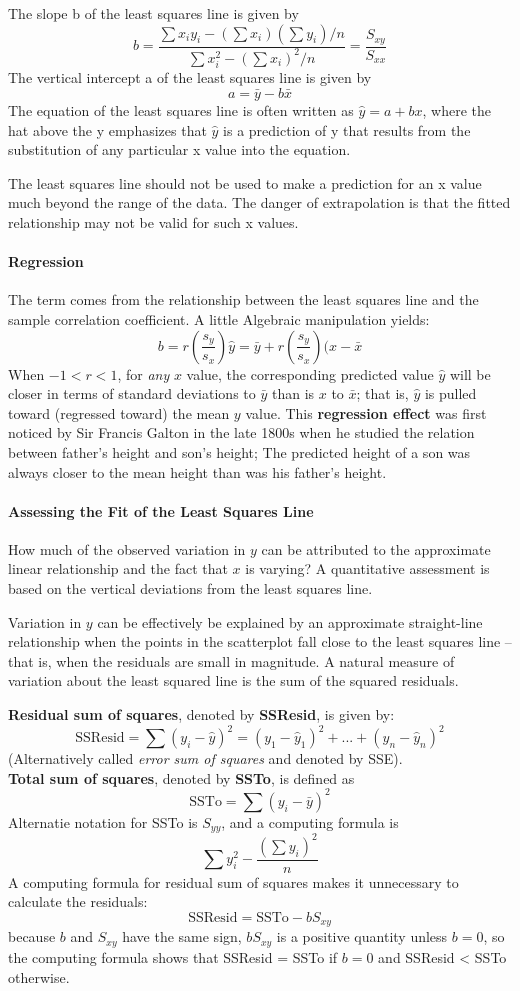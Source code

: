 \documentclass{article}
\newcommand{\p}[1]{\paragraph{#1}} %
\begin{document}
		The slope b of the least squares line is given by
		\[ b = \frac{\sum x_iy_i - \left(\sum x_i\right)\left(\sum y_i\right) / n}{\sum x_i^2 - \left(\sum 
		x_i\right)^2 / n} = \frac{S_{xy}}{S_{xx}} \]
		The vertical intercept a of the least squares line is given by
		\[ a = \bar{y} - b\bar{x} \]
		The equation of the least squares line is often written as $\hat{y} = a + bx$, where the hat 
		above the y emphasizes that $\hat{y}$ is a prediction of y that results from the substitution 
		of any particular x value into the equation.
		
		The least squares line should not be used to make a prediction for an x value much 
		beyond the range of the data. The danger of extrapolation is that the fitted relationship 
		may not be valid for such x values.
		
	\p{Regression}
		The term comes from the relationship between the least squares line and the sample 
		correlation coefficient. A little Algebraic manipulation yields:
		\[ b = r\left(\frac{s_y}{s_x}\right) \text{} \hat{y} = \bar{y} + r\left(\frac{s_y}{s_x}\right)(x-
		\bar{x} \]
		When $-1 < r < 1$, for \textit{any} $x$ value, the corresponding predicted value $\hat{y}$ 
		will be closer in terms of standard deviations to $\bar{y}$ than is $x$ to $\bar{x}$; that is, $
		\hat{y}$ is pulled toward (regressed toward) the mean $y$ value. This \textbf{regression 
		effect} was first noticed by Sir Francis Galton in the late 1800s when he studied the 
		relation between father's height and son's height; The predicted height of a son was 
		always closer to the mean height than was his father's height. 
		
	\p{Assessing the Fit of the Least Squares Line}
		How much of the observed variation in $y$ can be attributed to the approximate linear 
		relationship and the fact that $x$ is varying? A quantitative assessment is based on the 
		vertical deviations from the least squares line. 
		
		Variation in $y$ can be effectively be explained by an approximate straight-line 
		relationship when the points in the scatterplot fall close to the least squares line -- that is, 
		when the residuals are small in magnitude. A natural measure of variation about the least 
		squared line is the sum of the squared residuals.
		
		\textbf{Residual sum of squares}, denoted by \textbf{SSResid}, is given by:
		\[ \text{SSResid} = \sum(y_i-\hat{y})^2 = (y_1-\hat{y}_1)^2 +...+ (y_n-\hat{y}_n)^2 \]
		(Alternatively called \textit{error sum of squares} and denoted by SSE).\\
		\textbf{Total sum of squares}, denoted by \textbf{SSTo}, is defined as
		\[ \text{SSTo} = \sum(y_i-\bar{y})^2 \]
		Alternatie notation for SSTo is $S_{yy}$, and a computing formula is
		\[ \sum y_i^2 - \frac{\left(\sum y_i\right)^2}{n} \]
		A computing formula for residual sum of squares makes it unnecessary to calculate the 
		residuals:
		\[ \text{SSResid} = \text{SSTo} - bS_{xy} \]
		because $b$ and $S_{xy}$ have the same sign, $bS_{xy}$ is a positive quantity unless 
		$b=0$, so the computing formula shows that SSResid = SSTo if $b=0$ and SSResid < 
		SSTo otherwise.
		
\end{document}
